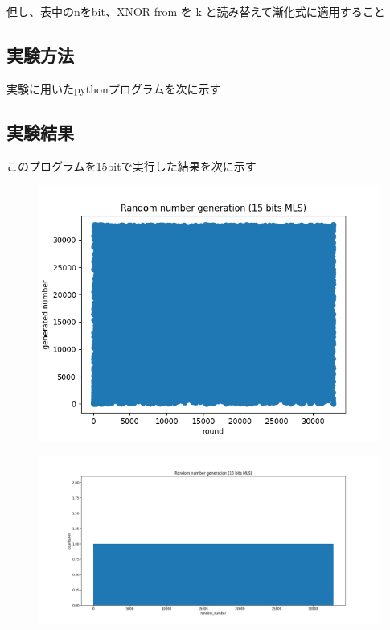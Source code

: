 \documentclass[xelatex,ja=standard]{bxjsarticle}
\begin{document}
但し、表中のnをbit、XNOR from を k と読み替えて漸化式に適用すること


\subsection{実験方法}

実験に用いたpythonプログラムを次に示す


\subsection{実験結果}

このプログラムを15bitで実行した結果を次に示す

\begin{figure}[htbp]
    \centering
    \includegraphics[scale=1]
{2.png}
    \label{fig:1}
\end{figure}

\begin{figure}[htbp]
    \centering
    \includegraphics[scale=0.5]
{3.png}
    \label{fig:1}
\end{figure}
\end{document}
